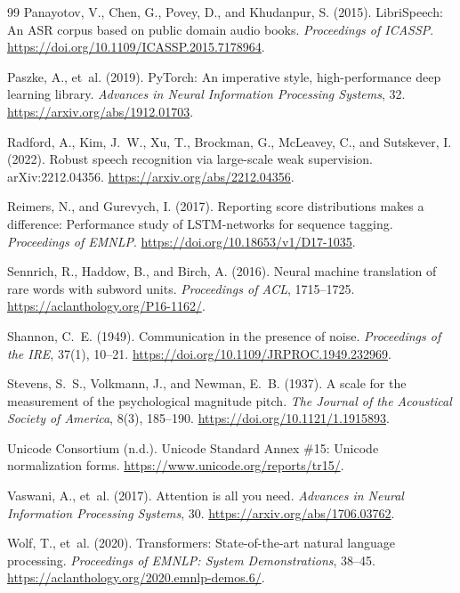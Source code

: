 {\begin{thebibliography}{99}
Panayotov, V., Chen, G., Povey, D., and Khudanpur, S. (2015).
LibriSpeech: An ASR corpus based on public domain audio books.
\emph{Proceedings of ICASSP}.
\url{https://doi.org/10.1109/ICASSP.2015.7178964}.

Paszke, A., et~al. (2019). PyTorch: An imperative style, high-performance deep
learning library. \emph{Advances in Neural Information Processing Systems}, 32.
\url{https://arxiv.org/abs/1912.01703}.

Radford, A., Kim, J.~W., Xu, T., Brockman, G., McLeavey, C., and Sutskever, I.
(2022). Robust speech recognition via large-scale weak supervision.
arXiv:2212.04356. \url{https://arxiv.org/abs/2212.04356}.

Reimers, N., and Gurevych, I. (2017). Reporting score distributions makes a
difference: Performance study of LSTM-networks for sequence tagging.
\emph{Proceedings of EMNLP}.
\url{https://doi.org/10.18653/v1/D17-1035}.

Sennrich, R., Haddow, B., and Birch, A. (2016).
Neural machine translation of rare words with subword units.
\emph{Proceedings of ACL}, 1715--1725.
\url{https://aclanthology.org/P16-1162/}.

Shannon, C.~E. (1949). Communication in the presence of noise.
\emph{Proceedings of the IRE}, 37(1), 10--21.
\url{https://doi.org/10.1109/JRPROC.1949.232969}.

Stevens, S.~S., Volkmann, J., and Newman, E.~B. (1937).
A scale for the measurement of the psychological magnitude pitch.
\emph{The Journal of the Acoustical Society of America}, 8(3), 185--190.
\url{https://doi.org/10.1121/1.1915893}.

Unicode Consortium (n.d.). Unicode Standard Annex \#15: Unicode normalization
forms. \url{https://www.unicode.org/reports/tr15/}.

Vaswani, A., et~al. (2017). Attention is all you need.
\emph{Advances in Neural Information Processing Systems}, 30.
\url{https://arxiv.org/abs/1706.03762}.

Wolf, T., et~al. (2020). Transformers: State-of-the-art natural language
processing. \emph{Proceedings of EMNLP: System Demonstrations}, 38--45.
\url{https://aclanthology.org/2020.emnlp-demos.6/}.


\end{thebibliography}}
